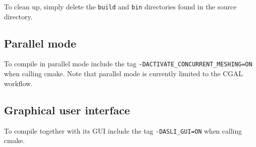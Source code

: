 To clean up, simply delete the \texttt{build} and \texttt{bin} directories found in the source directory.

\subsection{Parallel mode}
To compile \asli{} in parallel mode include the tag \verb|-DACTIVATE_|\hspace{0pt}\verb|CONCURRENT_|\hspace{0pt}\verb|MESHING=ON| when calling cmake. Note that parallel mode is currently limited to the CGAL workflow.

\subsection{Graphical user interface}
To compile \asli{} together with its GUI include the tag \verb|-DASLI_GUI=ON| when calling cmake.